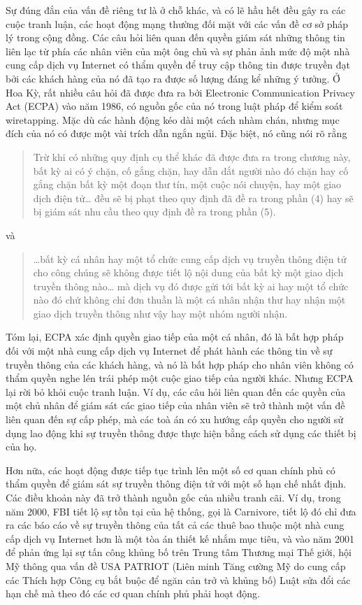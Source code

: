 Sự đúng đắn của vấn đề riêng tư là ở chỗ khác, và có lẽ hầu hết đều gây ra các cuộc tranh
luận, các hoạt động mạng thường đối mặt với các vấn đề cơ sở pháp lý trong cộng đồng. Các
câu hỏi liên quan đến quyền giám sát những thông tin liên lạc từ phía các nhân viên của
một ông chủ và sự phản ảnh mức độ một nhà cung cấp dịch vụ Internet có thẩm quyền để truy
cập thông tin được truyền đạt bởi các khách hàng của nó đã tạo ra được số lượng đáng kể
những ý tưởng. Ở Hoa Kỳ, rất nhiều câu hỏi đã được đưa ra bởi Electronic Communication
Privacy Act (ECPA) vào năm 1986, có nguồn gốc của nó trong luật pháp để kiểm soát
wiretapping. Mặc dù các hành động kéo dài một cách nhàm chán, nhưng mục đích của nó có
được một vài trích dẫn ngắn ngủi. Đặc biệt, nó cũng nói rõ rằng

\begin{quotation} \small Trừ khi có những quy định cụ thể khác đã được đưa ra trong chương
  này, bất kỳ ai có ý chặn, cố gắng chặn, hay dẫn dắt người nào đó chặn hay cố gắng chặn
  bất kỳ một đoạn thư tín, một cuộc nói chuyện, hay một giao dịch điện tử… đều sẽ bị phạt
  theo quy định đã đề ra trong phần (4) hay sẽ bị giám sát nhu cầu theo quy định đề ra
  trong phần (5).
\end{quotation}
và
\begin{quotation} \small …bất kỳ cá nhân hay một tổ chức cung cấp dịch vụ truyền thông
  điện tử cho công chúng sẽ không được tiết lộ nội dung của bất kỳ một giao dịch truyền
  thông nào… mà dịch vụ đó được gửi tới bất kỳ ai hay một tổ chức nào đó chứ không chỉ đơn
  thuần là một cá nhân nhận thư hay nhận một giao dịch truyền thông như vậy hay một nhóm
  người nhận.
\end{quotation}


Tóm lại, ECPA xác định quyền giao tiếp của một cá nhân, đó là bất hợp pháp đối với một nhà
cung cấp dịch vụ Internet để phát hành các thông tin về sự truyền thông của các khách
hàng, và nó là bất hợp pháp cho nhân viên không có thẩm quyền nghe lén trái phép một cuộc
giao tiếp của người khác. Nhưng ECPA lại rời bỏ khỏi cuộc tranh luận. Ví dụ, các câu hỏi
liên quan đến các quyền của một chủ nhân để giám sát các giao tiếp của nhân viên sẽ trở
thành một vấn đề liên quan đến sự cấp phép, mà các toà án có xu hướng cấp quyền cho người
sử dụng lao động khi sự truyền thông được thực hiện bằng cách sử dụng các thiết bị của họ.


Hơn nữa, các hoạt động được tiếp tục trình lên một số cơ quan chính phủ có thẩm quyền để
giám sát sự truyền thông điện tử với một số hạn chế nhất định. Các điều khoản này đã trở
thành nguồn gốc của nhiều tranh cãi. Ví dụ, trong năm 2000, FBI tiết lộ sự tồn tại của hệ
thống, gọi là Carnivore, tiết lộ đó chỉ đưa ra các báo cáo về sự truyền thông của tất cả
các thuê bao thuộc một nhà cung cấp dịch vụ Internet hơn là một tòa án thiết kế nhắm mục
tiêu, và vào năm 2001 để phản ứng lại sự tấn công khủng bố trên Trung tâm Thương mại Thế
giới, hội Mỹ thông qua vấn đề USA PATRIOT (Liên minh Tăng cường Mỹ do cung cấp các Thích
hợp Công cụ bắt buộc để ngăn cản trở và khủng bố) Luật sửa đổi các hạn chế mà theo đó các
cơ quan chính phủ phải hoạt động.


